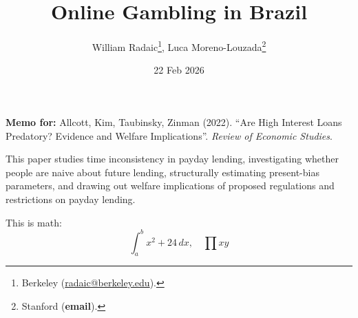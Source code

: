 \documentclass[english,11pt]{wr-note}
\title{Online Gambling in Brazil}
\author{William Radaic\thanks{Berkeley (\url{radaic@berkeley.edu}).}, Luca Moreno-Louzada\thanks{Stanford (\textbf{email}).}}
\date{22 Feb 2026}
\begin{document}
\maketitle


\textbf{Memo for:} Allcott, Kim, Taubinsky, Zinman (2022). “Are High Interest Loans Predatory? Evidence and Welfare Implications”. \textit{Review of Economic Studies}.

\medskip 


This paper studies time inconsistency in payday lending, investigating whether people are naive about future lending, structurally estimating present-bias parameters, and drawing out welfare implications of proposed regulations and restrictions on payday lending.

This is math: 
\begin{equation}
    \int_{a}^{b} x^2 + 24  \,dx, \quad \prod xy 
\end{equation}



\clearpage 
\printbibliography[title={References}]
\end{document}
